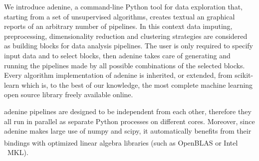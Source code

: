 \documentclass[twoside,11pt]{article}
\makeatletter
\newcommand{\ade}{{\sc adenine}\@\xspace}
\newcommand{\py}{{Python}\@\xspace}
\makeatother
\begin{document}


We introduce \ade, a command-line \py tool for data exploration that, starting from a set of unsupervised algorithms, creates textual an graphical reports of an arbitrary number of pipelines. In this context data imputing, preprocessing, dimensionality reduction and clustering strategies are considered as building blocks for data analysis pipelines. The user is only required to specify input data and to select blocks, then \ade takes care of generating and running the pipelines made by all possible combinations of the selected blocks. Every algorithm implementation of \ade is inherited, or extended, from {\sc scikit-learn} \citep{scikit-learn} which is, to the best of our knowledge, the most complete machine learning open source library freely available online.

\ade pipelines are designed to be independent from each other, therefore they all run in parallel as separate \py processes on different cores.
Moreover, since \ade makes large use of {\sc numpy} and {\sc scipy}, it automatically benefits from their bindings with optimized linear algebra libraries (such as OpenBLAS or Intel \textsuperscript{\textregistered}~MKL).
\end{document}
